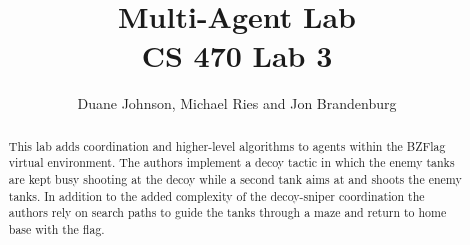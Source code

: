 \documentclass[letterpaper,12pt]{report}
\begin{document}
\title{Multi-Agent Lab \\
{\large \textbf{CS 470 Lab 3}}}
\author{Duane Johnson, Michael Ries and Jon Brandenburg}
\maketitle
\begin{abstract}
This lab adds coordination and higher-level algorithms to agents within the BZFlag virtual environment.
The authors implement a decoy tactic in which the enemy tanks are kept busy shooting at the decoy while
a second tank aims at and shoots the enemy tanks.  In addition to the added complexity of the decoy-sniper
coordination the authors rely on search paths to guide the tanks through a maze and return to home base
with the flag.
\end{abstract}
\tableofcontents



%
\appendix

%
%
%
%
\end{document}
